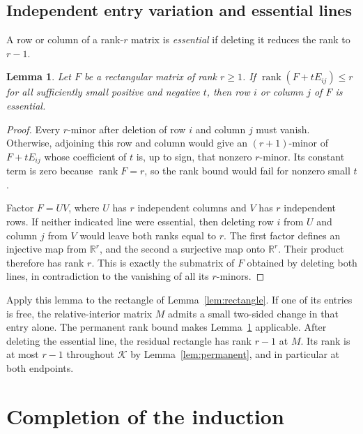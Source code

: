 \documentclass[11pt]{article}
\newtheorem{lemma}[theorem]{Lemma}
\theoremstyle{definition}
\theoremstyle{remark}
\numberwithin{equation}{section}
\newcommand{\R}{\mathbb R}
\newcommand{\K}{\mathcal K}
\DeclareMathOperator{\rank}{rank}
\begin{document}
\subsection{Independent entry variation and essential lines}

A row or column of a rank-$r$ matrix is \emph{essential} if
deleting it reduces the rank to $r-1$.

\begin{lemma}\label{lem:essential}
Let $F$ be a rectangular matrix of rank $r\geq1$.
If $\rank(F+tE_{ij})\leq r$ for all sufficiently small positive
and negative $t$, then row $i$ or column $j$ of $F$ is essential.
\end{lemma}

\begin{proof}
Every $r$-minor after deletion of row $i$ and column $j$ must
vanish. Otherwise, adjoining this row and column would give an
$(r+1)$-minor of $F+tE_{ij}$ whose coefficient of $t$ is, up to
sign, that nonzero $r$-minor. Its constant term is zero because
$\rank F=r$, so the rank bound would fail for nonzero small $t$.

Factor $F=UV$, where $U$ has $r$ independent columns and $V$
has $r$ independent rows. If neither indicated line were essential,
then deleting row $i$ from $U$ and column $j$ from $V$ would
leave both ranks equal to $r$. The first factor defines an
injective map from $\R^r$, and the second a surjective map onto
$\R^r$. Their product therefore has rank $r$. This is exactly
the submatrix of $F$ obtained by deleting both lines, in
contradiction to the vanishing of all its $r$-minors.
\end{proof}

Apply this lemma to the rectangle of Lemma~\ref{lem:rectangle}.
If one of its entries is free, the relative-interior matrix $M$
admits a small two-sided change in that entry alone. The permanent
rank bound makes Lemma~\ref{lem:essential} applicable. After
deleting the essential line, the residual rectangle has rank
$r-1$ at $M$. Its rank is at most $r-1$ throughout $\K$ by
Lemma~\ref{lem:permanent}, and in particular at both endpoints.

\section{Completion of the induction}\label{sec:induction}
\end{document}
